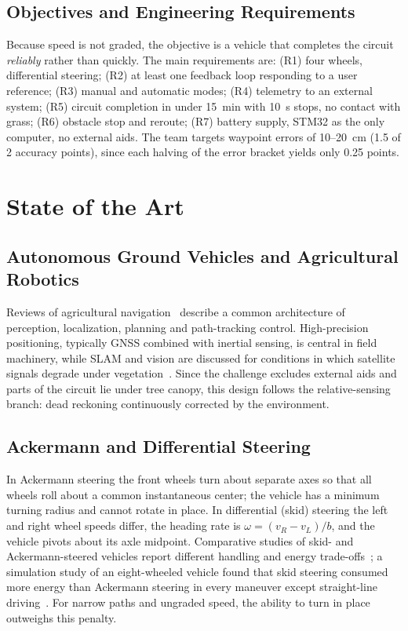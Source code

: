 \documentclass[conference]{IEEEtran}\newcommand{\haveieee}{}%
\begin{document}
\subsection{Objectives and Engineering Requirements}
Because speed is not graded, the objective is a vehicle that completes the circuit \emph{reliably} rather than quickly. The main requirements are: (R1) four wheels, differential steering; (R2) at least one feedback loop responding to a user reference; (R3) manual and automatic modes; (R4) telemetry to an external system; (R5) circuit completion in under 15~min with 10~s stops, no contact with grass; (R6) obstacle stop and reroute; (R7) battery supply, STM32 as the only computer, no external aids. The team targets waypoint errors of 10--20~cm (1.5 of 2 accuracy points), since each halving of the error bracket yields only 0.25 points.

\section{State of the Art}

\subsection{Autonomous Ground Vehicles and Agricultural Robotics}
Reviews of agricultural navigation~\cite{wu2025,boros2026,mousazadeh2013} describe a common architecture of perception, localization, planning and path-tracking control. High-precision positioning, typically GNSS combined with inertial sensing, is central in field machinery, while SLAM and vision are discussed for conditions in which satellite signals degrade under vegetation~\cite{wu2025,boros2026}. Since the challenge excludes external aids and parts of the circuit lie under tree canopy, this design follows the relative-sensing branch: dead reckoning continuously corrected by the environment.

\subsection{Ackermann and Differential Steering}
In Ackermann steering the front wheels turn about separate axes so that all wheels roll about a common instantaneous center; the vehicle has a minimum turning radius and cannot rotate in place. In differential (skid) steering the left and right wheel speeds differ, the heading rate is $\omega=(v_R-v_L)/b$, and the vehicle pivots about its axle midpoint. Comparative studies of skid- and Ackermann-steered vehicles report different handling and energy trade-offs~\cite{maclaurin2008,goodell2019}; a simulation study of an eight-wheeled vehicle found that skid steering consumed more energy than Ackermann steering in every maneuver except straight-line driving~\cite{goodell2019}. For narrow paths and ungraded speed, the ability to turn in place outweighs this penalty.
\end{document}
